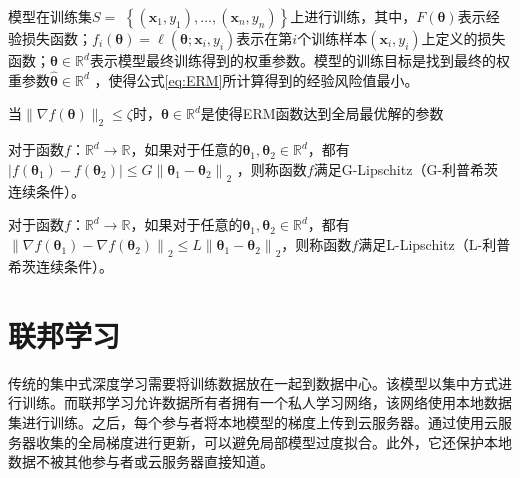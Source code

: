 模型在训练集$S=$ $\left\{\left(\mathbf{x}_{1}, y_{1}\right), \ldots,\left(\mathbf{x}_{n}, y_{n}\right)\right\}$上进行训练，其中，$F(\boldsymbol{\theta})$表示经验损失函数；$f_{i}(\boldsymbol{\theta})=\ell\left(\boldsymbol{\theta} ; \mathbf{x}_{i}, y_{i}\right)$表示在第$i$个训练样本$\left(\mathbf{x}_{i}, y_{i}\right)$上定义的损失函数；$\boldsymbol{\theta} \in \mathbb{R}^{d}$表示模型最终训练得到的权重参数。模型的训练目标是找到最终的权重参数$\widehat{\boldsymbol{\theta}} \in \mathbb{R}^{d}$ ，使得公式\ref{eq:ERM}所计算得到的经验风险值最小。

\begin{define}\label{全局最优点}
当$\|\nabla f(\boldsymbol{\theta})\|_{2} \leq \zeta$时，$\boldsymbol{\theta} \in \mathbb{R}^{d}$是使得ERM函数达到全局最优解的参数
\end{define}

\begin{define}\label{G-Lipschitz}
对于函数$f$：$\mathbb{R}^{d} \rightarrow \mathbb{R}$，如果对于任意的$\boldsymbol{\theta}_{1}, \boldsymbol{\theta}_{2} \in \mathbb{R}^{d}$，都有$\left|f\left(\boldsymbol{\theta}_{1}\right)-f\left(\boldsymbol{\theta}_{2}\right)\right| \leq G\left\|\boldsymbol{\theta}_{1}-\boldsymbol{\theta}_{2}\right\|_{2}$
，则称函数$f$满足G-Lipschitz（G-利普希茨连续条件）。
\end{define}

\begin{define}\label{L-Lipschitz}
对于函数$f$：$\mathbb{R}^{d} \rightarrow \mathbb{R}$，如果对于任意的$\boldsymbol{\theta}_{1}, \boldsymbol{\theta}_{2} \in \mathbb{R}^{d}$，都有\\$\left\|\nabla f\left(\boldsymbol{\theta}_{1}\right)-\nabla f\left(\boldsymbol{\theta}_{2}\right)\right\|_{2} \leq L\left\|\boldsymbol{\theta}_{1}-\boldsymbol{\theta}_{2}\right\|_{2}$，则称函数$f$满足L-Lipschitz（L-利普希茨连续条件）。
\end{define}

\section{联邦学习}
传统的集中式深度学习需要将训练数据放在一起到数据中心。该模型以集中方式进行训练。而联邦学习允许数据所有者拥有一个私人学习网络，该网络使用本地数据集进行训练。之后，每个参与者将本地模型的梯度上传到云服务器。通过使用云服务器收集的全局梯度进行更新，可以避免局部模型过度拟合。此外，它还保护本地数据不被其他参与者或云服务器直接知道。

